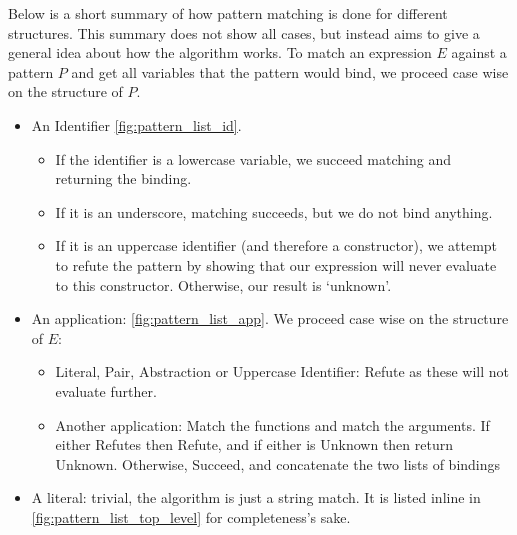 Below is a short summary of how pattern matching is done for different structures. This summary does not show all cases, but instead aims to give a general idea about how the algorithm works. To match an expression $E$ against a pattern $P$ and get all variables that the pattern would bind, we proceed case wise on the structure of $P$. 
\begin{itemize}
    \item An Identifier \ref{fig:pattern_list_id}. 
    \begin{itemize}
        \item If the identifier is a lowercase variable, we succeed matching and returning the binding.
        \item If it is an underscore, matching succeeds, but we do not bind anything. 
        \item If it is an uppercase identifier (and therefore a constructor), we attempt to refute the pattern by showing that our expression will never evaluate to this constructor. Otherwise, our result is `unknown'.
    \end{itemize}

    
    \item An application: \ref{fig:pattern_list_app}. We proceed case wise on the structure of $E$:
    \begin{itemize}
        \item Literal, Pair, Abstraction or Uppercase Identifier: Refute as these will not evaluate further.
        \item Another application: Match the functions and match the arguments. If either Refutes then Refute, and if either is Unknown then return Unknown. Otherwise, Succeed, and concatenate the two lists of bindings
    \end{itemize} 

    \item A literal: trivial, the algorithm is just a string match. It is listed inline in \ref{fig:pattern_list_top_level} for completeness's sake. 
\end{itemize}

